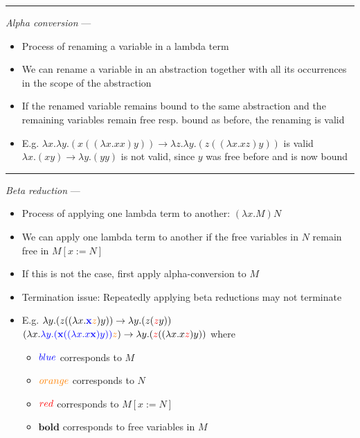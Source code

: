 {\color{lightgray}\hrule height 0.001mm}

\emph{Alpha conversion} ---
\begin{itemize}
    \item Process of renaming a variable in a lambda term 
    \item We can rename a variable in an abstraction together with all its occurrences in the scope of the abstraction
    \item If the renamed variable remains bound to the same abstraction and the remaining variables remain free resp. bound as before, the renaming is valid
    \item E.g. 
    $\lambda x.\lambda y.(x((\lambda x. x x) y )) \to \lambda z. \lambda y. (z((\lambda x. x z) y))$ is valid\\
    $\lambda x.(xy) \to \lambda y.(yy)$ is not valid, since $y$ was free before and is now bound
\end{itemize}

{\color{lightgray}\hrule height 0.001mm}

\emph{Beta reduction} ---
\begin{itemize}
    \item Process of applying one lambda term to another: $(\lambda x.M)N$
    \item We can apply one lambda term to another if the free variables in $N$ remain free in $M[x := N]$
    \item If this is not the case, first apply alpha-conversion to $M$
    \item Termination issue: Repeatedly applying beta reductions may not terminate
    \item E.g. $\lambda y.(z((\lambda x.\textcolor{blue}{\mathbf{x}}\textcolor{orange}{z})y)) \to \lambda y.(z(\textcolor{red}{z}y))$\\
    $(\lambda x.\textcolor{blue}{\lambda y.(\mathbf{x}((\lambda x.x\mathbf{x})y))}\textcolor{orange}{z}) \to \lambda y.(\textcolor{red}{z}((\lambda x.x\textcolor{red}{z})y))$
    where
    \begin{itemize}
        \item $\textcolor{blue}{blue}$ corresponds to $M$
        \item $\textcolor{orange}{orange}$ corresponds to $N$
        \item $\textcolor{red}{red}$ corresponds to $M[x := N]$
        \item $\boldsymbol{bold}$ corresponds to free variables in $M$
    \end{itemize}
\end{itemize}

